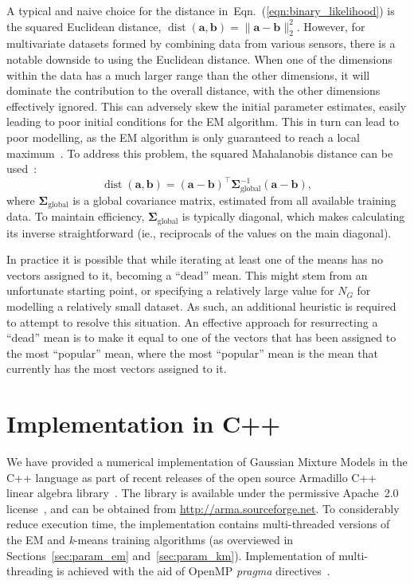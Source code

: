 \documentclass[10pt,a4paper]{article}
\def\Vec#1{{\boldsymbol{#1}}}
\def\Mat#1{{\boldsymbol{#1}}}
\begin{document}
A typical and naive choice for the distance in~Eqn.~(\ref{eqn:binary_likelihood})
is the squared Euclidean distance, \mbox{$\operatorname{dist}(\Vec{a}, \Vec{b}) = \| \Vec{a} - \Vec{b} \|^{2}_{2}$}.
However, for multivariate datasets formed by combining data from various sensors, there is a notable downside to using the Euclidean distance.
When one of the dimensions within the data has a much larger range than the other dimensions,
it will dominate the contribution to the overall distance, with the other dimensions effectively ignored.
This can adversely skew the initial parameter estimates, easily leading to poor initial conditions for the EM algorithm.
This in turn can lead to poor modelling, as the EM algorithm is only guaranteed to reach a local maximum~\cite{Dempster77,Duda01,Mitchell97}.
To address this problem, the squared Mahalanobis distance can be used~\cite{Bishop_2006,Duda01}:
%
\begin{equation}
\operatorname{dist}(\Vec{a}, \Vec{b}) = (\Vec{a} - \Vec{b})^\top \Mat{\Sigma}^{-1}_{\mathrm{global}} (\Vec{a} - \Vec{b}),
\end{equation}
\noindent where $\Mat{\Sigma}_{\mathrm{global}}$ is a global covariance matrix, estimated from all available training data.
To maintain efficiency, $\Mat{\Sigma}_{\mathrm{global}}$ is typically diagonal,
which makes calculating its inverse straightforward (ie., reciprocals of the values on the main diagonal).



In practice it is possible that while iterating at least one of the means has no vectors assigned to it,
becoming a ``dead'' mean.
This might stem from an unfortunate starting point, 
or specifying a relatively large value for $N_G$ for modelling a relatively small dataset.
As such, an additional heuristic is required to attempt to resolve this situation.
An effective approach for resurrecting a ``dead'' mean is to make it equal to one of the vectors
that has been assigned to the most ``popular'' mean,
where the most ``popular'' mean is the mean that currently has the most vectors assigned to it.



\newpage
\section{Implementation in C++}
\label{sec:implementation}

We have provided a numerical implementation of Gaussian Mixture Models in the C++ language
as part of recent releases of the open source Armadillo C++ linear algebra library~\cite{Armadillo_JOSS_2016}. %
The library is available under the permissive Apache~2.0 license~\cite{Laurent_2008},
and can be obtained from
\href{http://arma.sourceforge.net}{http://arma.sourceforge.net}.
To considerably reduce execution time,
the implementation contains multi-threaded versions of the EM and {\it k}-means training algorithms
(as overviewed in Sections~\ref{sec:param_em} and~\ref{sec:param_km}).
Implementation of multi-threading is achieved with the aid of OpenMP {\it pragma} directives~\cite{OpenMP_2007}.
\end{document}
